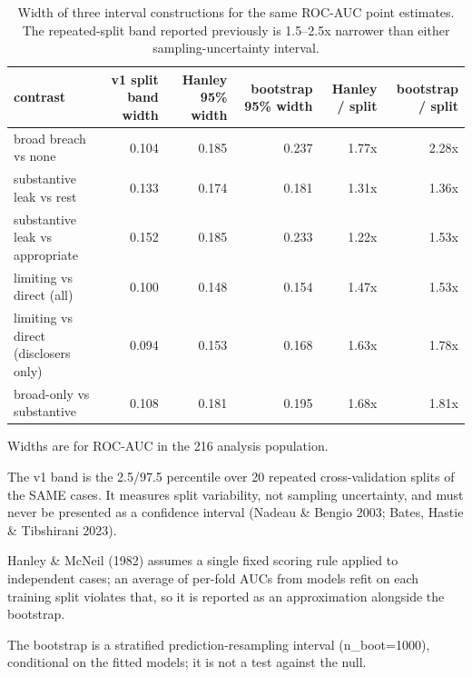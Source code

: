 \begin{table}[t]
\centering
\begin{threeparttable}
\caption{Width of three interval constructions for the same ROC-AUC point estimates. The repeated-split band reported previously is 1.5--2.5x narrower than either sampling-uncertainty interval.}
\label{tab:tab-interval-methods}
\small
\begin{tabular}{lrrrrr}
\toprule
contrast & v1 split band width & Hanley 95\% width & bootstrap 95\% width & Hanley / split & bootstrap / split \\
\midrule
broad breach vs none & 0.104 & 0.185 & 0.237 & 1.77x & 2.28x \\
substantive leak vs rest & 0.133 & 0.174 & 0.181 & 1.31x & 1.36x \\
substantive leak vs appropriate & 0.152 & 0.185 & 0.233 & 1.22x & 1.53x \\
limiting vs direct (all) & 0.100 & 0.148 & 0.154 & 1.47x & 1.53x \\
limiting vs direct (disclosers only) & 0.094 & 0.153 & 0.168 & 1.63x & 1.78x \\
broad-only vs substantive & 0.108 & 0.181 & 0.195 & 1.68x & 1.81x \\
\bottomrule
\end{tabular}
\begin{tablenotes}[flushleft]\footnotesize
\item Widths are for ROC-AUC in the 216 analysis population.
\item The v1 band is the 2.5/97.5 percentile over 20 repeated cross-validation splits of the SAME cases. It measures split variability, not sampling uncertainty, and must never be presented as a confidence interval (Nadeau \& Bengio 2003; Bates, Hastie \& Tibshirani 2023).
\item Hanley \& McNeil (1982) assumes a single fixed scoring rule applied to independent cases; an average of per-fold AUCs from models refit on each training split violates that, so it is reported as an approximation alongside the bootstrap.
\item The bootstrap is a stratified prediction-resampling interval (n\_boot=1000), conditional on the fitted models; it is not a test against the null.
\end{tablenotes}
\end{threeparttable}
\end{table}
